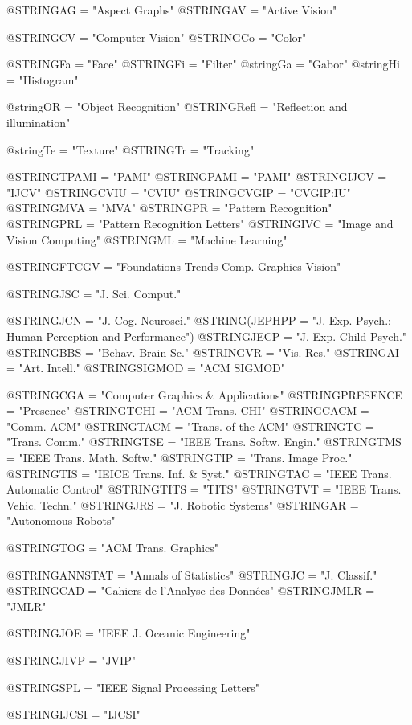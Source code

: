 @STRING{AG = "Aspect Graphs"}
@STRING{AV = "Active Vision"}

@STRING{CV = "Computer Vision"}
@STRING{Co = "Color"}

@STRING{Fa = "Face"}
@STRING{Fi = "Filter"}
@string{Ga = "Gabor"}
@string{Hi = "Histogram"}

@string{OR = "Object Recognition"}
@STRING{Refl = "Reflection and illumination"}

@string{Te = "Texture"}
@STRING{Tr = "Tracking"}


@STRING{TPAMI = "PAMI"}
@STRING{PAMI  = "PAMI"}
@STRING{IJCV  = "IJCV"}
@STRING{CVIU  = "CVIU"}
@STRING{CVGIP = "CVGIP:IU"}
@STRING{MVA   = "MVA"}
@STRING{PR    = "Pattern Recognition"}
@STRING{PRL   = "Pattern Recognition Letters"}
@STRING{IVC   = "Image and Vision Computing"}
@STRING{ML    = "Machine Learning"}

@STRING{FTCGV = "Foundations Trends Comp. Graphics Vision"}

@STRING{JSC    = "J. Sci. Comput."}

@STRING{JCN    = "J. Cog. Neurosci."}
@STRING(JEPHPP = "J. Exp. Psych.: Human Perception and Performance")
@STRING{JECP   = "J. Exp. Child Psych."}
@STRING{BBS    = "Behav. Brain Sc."}
@STRING{VR     = "Vis. Res."}
@STRING{AI     = "Art. Intell."}
@STRING{SIGMOD = "ACM SIGMOD"}

@STRING{CGA      = "Computer Graphics \& Applications"}
@STRING{PRESENCE = "Presence"}
@STRING{TCHI     = "ACM Trans. CHI"}
@STRING{CACM     = "Comm. ACM"}
@STRING{TACM     = "Trans. of the ACM"}
@STRING{TC       = "Trans. Comm."}
@STRING{TSE      = "IEEE Trans. Softw. Engin."}
@STRING{TMS      = "IEEE Trans. Math. Softw."}
@STRING{TIP      = "Trans. Image Proc."}
@STRING{TIS      = "IEICE Trans. Inf. & Syst."}
@STRING{TAC      = "IEEE Trans. Automatic Control"}
@STRING{TITS     = "TITS"}
@STRING{TVT      = "IEEE Trans. Vehic. Techn."}
@STRING{JRS      = "J. Robotic Systems"}
@STRING{AR       = "Autonomous Robots"}

@STRING{TOG      = "ACM Trans. Graphics"}

@STRING{ANNSTAT = "Annals of Statistics"}
@STRING{JC      = "J. Classif."}
@STRING{CAD     = "Cahiers de l'Analyse des Donn\'ees"}
@STRING{JMLR    = "JMLR"}

@STRING{JOE = "IEEE J. Oceanic Engineering"}

@STRING{JIVP = "JVIP"}

@STRING{SPL = "IEEE Signal Processing Letters"}

@STRING{IJCSI = "IJCSI"}


